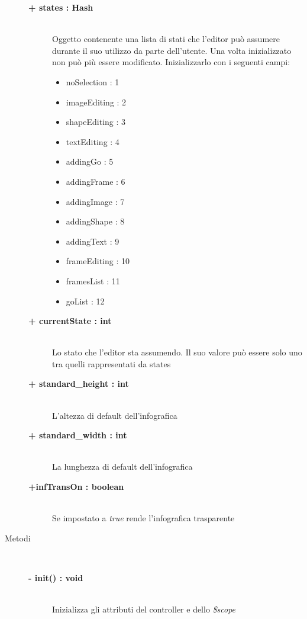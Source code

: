\begin{description}
\begin{description}
		\item[\textbf{+ states : Hash			}] \hfill \\
			Oggetto contenente una lista di stati che l'editor può assumere durante il suo utilizzo da parte dell'utente. Una volta inizializzato non può più essere modificato. Inizializzarlo con i seguenti campi:
		\begin{itemize}
			\item noSelection : 1
			\item imageEditing : 2
			\item shapeEditing : 3
			\item textEditing : 4
			\item addingGo : 5
			\item addingFrame : 6
			\item addingImage : 7
			\item addingShape : 8
			\item addingText : 9
			\item frameEditing : 10
			\item framesList : 11
			\item goList : 12
		\end{itemize}
		\item[\textbf{+ currentState : int			}] \hfill \\
			Lo stato che l'editor sta assumendo. Il suo valore può essere solo uno tra quelli rappresentati da states
		\item[\textbf{+ standard\_height : int			}] \hfill \\
			L'altezza di default dell'infografica
		\item[\textbf{+ standard\_width : int			}] \hfill \\
			La lunghezza di default dell'infografica
		\item[\textbf{+infTransOn : boolean			}] \hfill \\
			Se impostato a \textit{true} rende l'infografica trasparente 
	\end{description}
	
	
	
\item[Metodi] \hfill \\

	\begin{description}
		\item[\textbf{\color{blue}- init() : void			}] \hfill \\
			Inizializza gli attributi del controller e dello \textit{\$scope}
			

\end{description}
\end{description}
